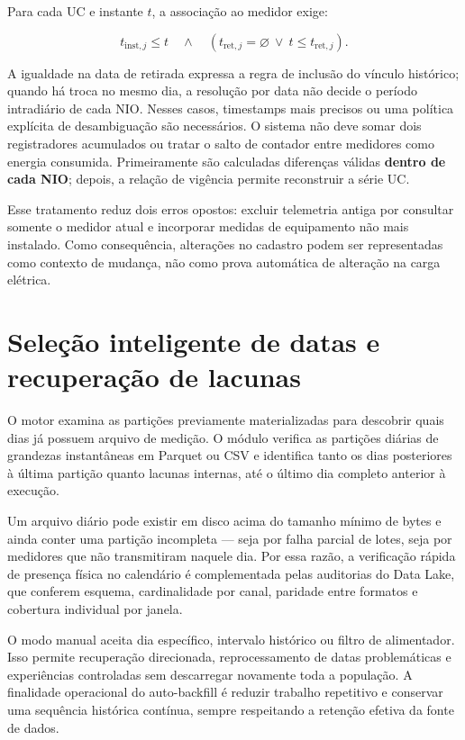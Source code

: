 Para cada UC e instante \(t\), a associação ao medidor exige:

\[t_{\mathrm{inst},j}\le t\quad\land\quad(t_{\mathrm{ret},j}=\varnothing\ \lor\ t\le t_{\mathrm{ret},j}).\]

A igualdade na data de retirada expressa a regra de inclusão do vínculo histórico; quando há troca no mesmo dia, a resolução por data não decide o período intradiário de cada NIO. Nesses casos, timestamps mais precisos ou uma política explícita de desambiguação são necessários. O sistema não deve somar dois registradores acumulados ou tratar o salto de contador entre medidores como energia consumida. Primeiramente são calculadas diferenças válidas \textbf{dentro de cada NIO}; depois, a relação de vigência permite reconstruir a série UC.

Esse tratamento reduz dois erros opostos: excluir telemetria antiga por consultar somente o medidor atual e incorporar medidas de equipamento não mais instalado. Como consequência, alterações no cadastro podem ser representadas como contexto de mudança, não como prova automática de alteração na carga elétrica.

\section{Seleção inteligente de datas e recuperação de lacunas}\label{seleuxe7uxe3o-inteligente-de-datas-e-recuperauxe7uxe3o-de-lacunas}

O motor examina as partições previamente materializadas para descobrir quais dias já possuem arquivo de medição. O módulo verifica as partições diárias de grandezas instantâneas em Parquet ou CSV e identifica tanto os dias posteriores à última partição quanto lacunas internas, até o último dia completo anterior à execução.

Um arquivo diário pode existir em disco acima do tamanho mínimo de bytes e ainda conter uma partição incompleta --- seja por falha parcial de lotes, seja por medidores que não transmitiram naquele dia. Por essa razão, a verificação rápida de presença física no calendário é complementada pelas auditorias do Data Lake, que conferem esquema, cardinalidade por canal, paridade entre formatos e cobertura individual por janela.

O modo manual aceita dia específico, intervalo histórico ou filtro de alimentador. Isso permite recuperação direcionada, reprocessamento de datas problemáticas e experiências controladas sem descarregar novamente toda a população. A finalidade operacional do auto-backfill é reduzir trabalho repetitivo e conservar uma sequência histórica contínua, sempre respeitando a retenção efetiva da fonte de dados.

